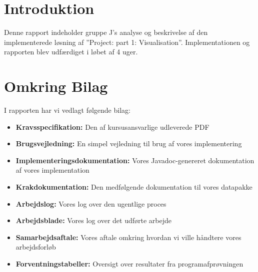 \section{Introduktion}
Denne rapport indeholder gruppe J's analyse og beskrivelse af den implementerede løsning af ''Project: part 1: Visualisation''. Implementationen og rapporten blev udfærdiget i løbet af 4 uger.
\section{Omkring Bilag}
I rapporten har vi vedlagt følgende bilag:
\begin{itemize}
\item{\textbf{Kravsspecifikation:} Den af kursusansvarlige udleverede PDF}
\item{\textbf{Brugsvejledning:} En simpel vejledning til brug af vores implementering}
\item{\textbf{Implementeringsdokumentation:} Vores Javadoc-genereret dokumentation af vores implementation}
\item{\textbf{Krakdokumentation:} Den medfølgende dokumentation til vores datapakke}
\item{\textbf{Arbejdslog:} Vores log over den ugentlige proces}
\item{\textbf{Arbejdsblade:} Vores log over det udførte arbejde}
\item{\textbf{Samarbejdsaftale:} Vores aftale omkring hvordan vi ville håndtere vores arbejdsforløb}
\item{\textbf{Forventningstabeller:} Oversigt over resultater fra programafprøvningen} 
\end{itemize}

